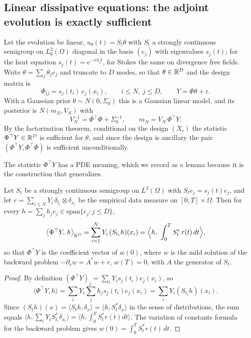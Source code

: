 \subsection{Linear dissipative equations: the adjoint evolution is exactly sufficient}

Let the evolution be linear, $u_\theta(t)=S_t\theta$ with $S_t$ a strongly continuous semigroup on $L^2_0(\Omega)$ diagonal in the basis $(e_j)$ with eigenvalues $s_j(t)$; for the heat equation $s_j(t)=e^{-\nu\lambda_jt}$, for Stokes the same on divergence free fields. Write $\theta=\sum_j\theta_je_j$ and truncate to $D$ modes, so that $\theta\in\mathbb{R}^D$ and the design matrix is
\begin{equation}\label{m:eq:design}
\Phi_{ij}=s_j(t_i)\,e_j(x_i),\qquad i\le N,\ j\le D,\qquad Y=\Phi\theta+\varepsilon .
\end{equation}
With a Gaussian prior $\theta\sim N(0,\Sigma_0)$ this is a Gaussian linear model, and its posterior is $N(m_N,V_N)$ with
\begin{equation}\label{m:eq:linpost}
V_N^{-1}=\Phi^\top\Phi+\Sigma_0^{-1},\qquad m_N=V_N\,\Phi^\top Y .
\end{equation}
By the factorization theorem, conditional on the design $(X_i)$ the statistic $\Phi^\top Y\in\mathbb{R}^D$ is sufficient for $\theta$, and since the design is ancillary the pair $(\Phi^\top Y,\Phi^\top\Phi)$ is sufficient unconditionally.

The statistic $\Phi^\top Y$ has a PDE meaning, which we record as a lemma because it is the construction that generalizes.

\begin{lemma}\label{m:lem:adjoint}
Let $S_t$ be a strongly continuous semigroup on $L^2(\Omega)$ with $S_te_j=s_j(t)e_j$, and let $r=\sum_{i\le N}Y_i\,\delta_{t_i}\otimes\delta_{x_i}$ be the empirical data measure on $[0,T]\times\Omega$. Then for every $h=\sum_jh_je_j\in\mathrm{span}\{e_j:j\le D\}$,
\[
\big\langle\Phi^\top Y,\,h\big\rangle_{\R^D}=\sum_{i=1}^NY_i\,(S_{t_i}h)(x_i)=\Big\langle h,\ \int_0^TS_t^*\,r(t)\,dt\Big\rangle ,
\]
so that $\Phi^\top Y$ is the coefficient vector of $w(0)$, where $w$ is the mild solution of the backward problem $-\partial_sw=A^*w+r$, $w(T)=0$, with $A$ the generator of $S_t$.
\end{lemma}

\begin{proof}
By definition $(\Phi^\top Y)_j=\sum_iY_is_j(t_i)e_j(x_i)$, so
\[
\langle\Phi^\top Y,h\rangle=\sum_iY_i\sum_jh_js_j(t_i)e_j(x_i)=\sum_iY_i(S_{t_i}h)(x_i).
\] Since $(S_th)(x)=\langle S_th,\delta_x\rangle=\langle h,S_t^*\delta_x\rangle$ in the sense of distributions, the sum equals $\langle h,\sum_iY_iS_{t_i}^*\delta_{x_i}\rangle=\langle h,\int_0^TS_t^*r(t)dt\rangle$. The variation of constants formula for the backward problem gives $w(0)=\int_0^TS^*_tr(t)\,dt$.
\end{proof}

